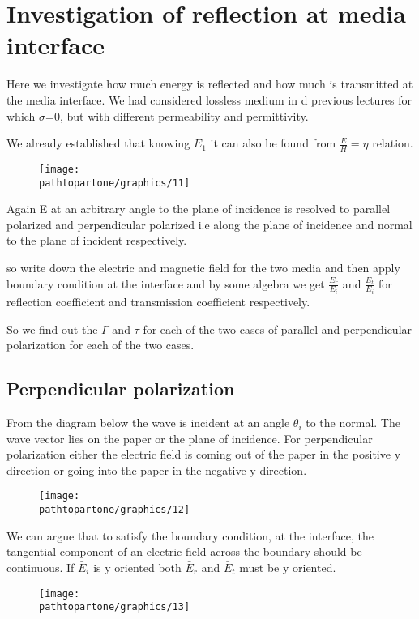 \chapter{Investigation of reflection at media interface}\label{lec:lec31}
Here we investigate how much energy is reflected and how much is transmitted at the media interface. We had considered lossless medium in d previous lectures for which $ \sigma $=0, but with different permeability and permittivity.

We already established that knowing $E_{1}$ it can also be found from $\frac{E}{H} = \eta$ relation.
\begin{figure}[h]
\centering
\texttt{[image: \\pathtopartone/graphics/11]}
\caption{}
\label{fg:11}
\end{figure}

Again E at an arbitrary angle to the plane of incidence is resolved to parallel polarized and perpendicular polarized i.e along the plane of incidence and normal to the plane of incident respectively.

so write down the electric and magnetic field for the two media and then apply boundary condition at the interface and by some algebra we get $\frac{E_{r}}{E_{i}}$ and $\frac{E_{t}}{E_{i}}$ for reflection coefficient and transmission coefficient respectively.

So we find out the $\Gamma$ and $\tau$ for each of the two cases of parallel and perpendicular polarization for each of the two cases.

\section{Perpendicular polarization} 
From the diagram below the wave is incident at an angle $\theta_{i}$ to the normal. The wave vector lies on the paper or the plane of incidence. For perpendicular polarization either the electric field is coming out of the paper in the positive y direction or going into the paper in the negative y direction.
\begin{figure}[h]
\centering
\texttt{[image: \\pathtopartone/graphics/12]}
\caption{}
\label{fig:12}
\end{figure}

We can argue that to satisfy the boundary condition, at the interface, the tangential component of an electric field across the boundary should be continuous. If $\bar{E}_{i}$ is y oriented both  $\bar{E}_{r}$ and  $\bar{E}_{t}$ must be y oriented.
\begin{figure}[h]
\centering
\texttt{[image: \\pathtopartone/graphics/13]}
\caption{}
\label{fig:13}
\end{figure}

